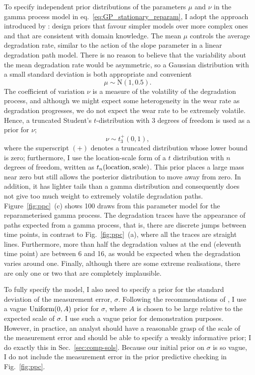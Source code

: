 To specify independent prior distributions of the parameters $\mu$ and $\nu$ in the gamma process model in eq.~\eqref{eq:GP_stationary_reparam}, I adopt the approach introduced by \cite{Simpson_2017}: design priors that favour simpler models over more complex ones and that are consistent with domain knowledge. The mean $\mu$ controls the average degradation rate, similar to the action of the slope parameter in a linear degradation path model. There is no reason to believe that the variability about the mean degradation rate would be asymmetric, so a Gaussian distribution with a small standard deviation is both appropriate and convenient
\begin{equation*}
  \mu \sim \mbox{N}(1, 0.5).
\end{equation*}
The coefficient of variation $\nu$ is a measure of the volatility of the degradation process, and although we might expect some heterogeneity in the wear rate as degradation progresses, we do not expect the wear rate to be extremely volatile. Hence, a truncated Student's $t$-distribution with 3 degrees of freedom is used as a prior for $\nu$;
\begin{equation*}
  \nu \sim t_3^{+}(0, 1),
\end{equation*}
where the superscript $(+)$ denotes a truncated distribution whose lower bound is zero; furthermore, I use the location-scale form of a $t$ distribution with $n$ degrees of freedom, written as $t_n(\hbox{location}, \hbox{scale})$. This prior places a large mass near zero but still allows the posterior distribution to move away from zero. In addition, it has lighter tails than a gamma distribution and consequently does not give too much weight to extremely volatile degradation paths. Figure~\ref{fig:ppc}~(c) shows 100 draws from this parameter model for the reparameterised gamma process. The degradation traces have the appearance of paths expected from a gamma process, that is, there are discrete jumps between time points, in contrast to Fig.~\ref{fig:ppc}~(a), where all the traces are straight lines. Furthermore, more than half the degradation values at the end (eleventh time point) are between 6 and 16, as would be expected when the degradation varies around one. Finally, although there are some extreme realisations, there are only one or two that are completely implausible.

To fully specify the model, I also need to specify a prior for the standard deviation of the measurement error, $\sigma$. Following the recommendations of \citet[Chap.~17]{gelman_workflow_2020}, I use a vague $\hbox{Uniform}(0, A)$ prior for $\sigma$, where $A$ is chosen to be large relative to the expected scale of $\sigma$. I use such a vague prior for demonstration purposes. However, in practice, an analyst should have a reasonable grasp of the scale of the measurement error and should be able to specify a weakly informative prior; I do exactly this in Sec.~\ref{sec:comp-sols}. Because our initial prior on $\sigma$ is so vague, I do not include the measurement error in the prior predictive checking in Fig.~\ref{fig:ppc}.

